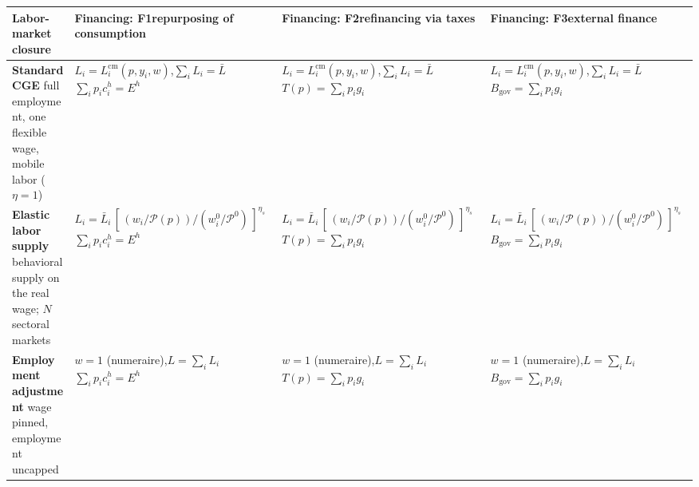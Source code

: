 \begin{table}[htbp]
\centering
\footnotesize
\setlength{\tabcolsep}{3pt}
\renewcommand{\arraystretch}{1.35}
\begin{tabular}{@{}>{\raggedright\arraybackslash}p{2.30cm}
                  >{\raggedright\arraybackslash}p{3.90cm}
                  >{\raggedright\arraybackslash}p{3.90cm}
                  >{\raggedright\arraybackslash}p{3.90cm}@{}}
\toprule
\textbf{Labor-market closure}
& \textbf{Financing: F1}\newline \scriptsize repurposing of consumption
& \textbf{Financing: F2}\newline \scriptsize refinancing via taxes
& \textbf{Financing: F3}\newline \scriptsize external finance \\
\midrule

\textbf{Standard CGE}\newline
  \scriptsize full employment, one flexible wage, mobile labor ($\eta = 1$)
& $L_i = L_i^{\mathrm{cm}}(p, y_i, w)$,\quad $\sum_i L_i = \bar L$
  \newline $\sum_i p_i c_i^{h} = E^{h}$
& $L_i = L_i^{\mathrm{cm}}(p, y_i, w)$,\quad $\sum_i L_i = \bar L$
  \newline $T(p) = \sum_i p_i g_i$
& $L_i = L_i^{\mathrm{cm}}(p, y_i, w)$,\quad $\sum_i L_i = \bar L$
  \newline $B_{\mathrm{gov}} = \sum_i p_i g_i$ \\
\midrule

\textbf{Elastic labor supply}\newline
  \scriptsize behavioral supply on the real wage; $N$ sectoral markets
& $L_i = \bar L_i\,[\,(w_i/\mathcal{P}(p))/(w_i^{0}/\mathcal{P}^{0})\,]^{\eta_s}$
  \newline $\sum_i p_i c_i^{h} = E^{h}$
& $L_i = \bar L_i\,[\,(w_i/\mathcal{P}(p))/(w_i^{0}/\mathcal{P}^{0})\,]^{\eta_s}$
  \newline $T(p) = \sum_i p_i g_i$
& $L_i = \bar L_i\,[\,(w_i/\mathcal{P}(p))/(w_i^{0}/\mathcal{P}^{0})\,]^{\eta_s}$
  \newline $B_{\mathrm{gov}} = \sum_i p_i g_i$ \\
\midrule

\textbf{Employment adjustment}\newline
  \scriptsize wage pinned, employment uncapped
& $w = 1$ (numeraire),\quad $L = \sum_i L_i$
  \newline $\sum_i p_i c_i^{h} = E^{h}$
& $w = 1$ (numeraire),\quad $L = \sum_i L_i$
  \newline $T(p) = \sum_i p_i g_i$
& $w = 1$ (numeraire),\quad $L = \sum_i L_i$
  \newline $B_{\mathrm{gov}} = \sum_i p_i g_i$ \\
\midrule


\end{tabular}
\end{table}
